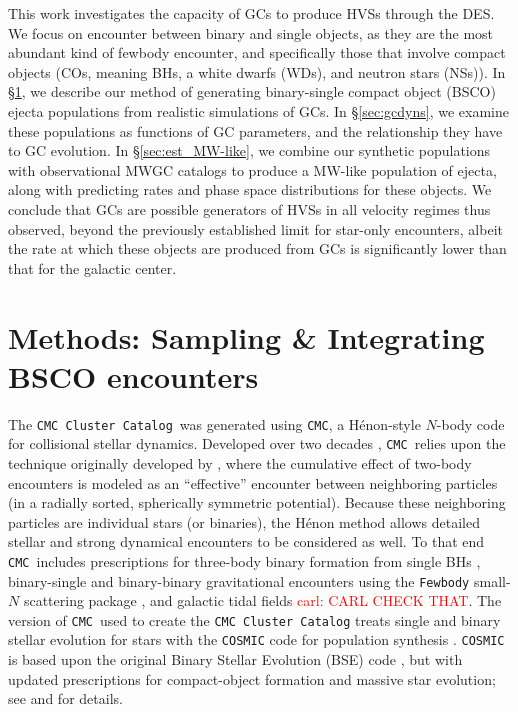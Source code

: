 \documentclass[twocolumn]{aastex631}
\newcommand{\CMC}{\texttt{CMC}}
\newcommand{\CMCcat}{\texttt{CMC Cluster Catalog}}
\newcommand{\carl}[1]{\textcolor{red}{carl: #1}}
\begin{document}
This work investigates the capacity of GCs to produce HVSs through the DES.
We focus on encounter between binary and single objects, as they are the most abundant kind of fewbody encounter, and specifically those that involve compact objects (COs, meaning BHs, a white dwarfs (WDs), and neutron stars (NSs)).
In \S\ref{sec:methods}, we describe our method of generating binary-single compact object (BSCO) ejecta populations from realistic simulations of GCs.
In \S\ref{sec:gcdyns}, we examine these populations as functions of GC parameters, and the relationship they have to GC evolution.
In \S\ref{sec:est_MW-like}, we combine our synthetic populations with observational MWGC catalogs to produce a MW-like population of ejecta, along with predicting rates and phase space distributions for these objects.
We conclude that GCs are possible generators of HVSs in all velocity regimes thus observed, beyond the previously established limit for star-only encounters, albeit the rate at which these objects are produced from GCs is significantly lower than that for the galactic center.

\section{Methods: Sampling \& Integrating BSCO encounters} \label{sec:methods}

The \CMCcat\ was generated using \CMC, a H\'enon-style $N$-body code for collisional stellar dynamics.  Developed over two decades \citep{2000ApJ...540..969J,2013ApJS..204...15P,Rodriguez2022}, \CMC\ relies upon the technique originally developed by \citet{1971Ap&SS..13..284H,1971Ap&SS..14..151H}, where the cumulative effect of two-body encounters is modeled as an ``effective'' encounter between neighboring particles (in a radially sorted, spherically symmetric  potential).  Because these neighboring particles are individual stars (or binaries), the H\'enon method allows detailed stellar and strong dynamical encounters to be considered as well. To that end \CMC~includes prescriptions for three-body binary formation from single BHs \citep{2013ApJ...763L..15M}, binary-single and binary-binary gravitational encounters using the \texttt{Fewbody} small-$N$ scattering package \citep{2004MNRAS.352....1F,2007ApJ...658.1047F}, and galactic tidal fields \citep{2013MNRAS.429.2881C} \carl{CARL CHECK THAT}.  The version of \CMC\ used to create the \CMCcat\citep[which used identical physics to the public version described in][]{Rodriguez2022} treats single and binary stellar evolution for stars with  the \texttt{COSMIC} code for population synthesis \citep{2020ApJ...898...71B}.  \texttt{COSMIC} is based upon the original Binary Stellar Evolution (BSE) code \citep{2000MNRAS.315..543H,2002MNRAS.329..897H}, but with updated prescriptions for compact-object formation and massive star evolution; see \citet{2020ApJ...898...71B} and \citet{Rodriguez2022} for details.
\end{document}
